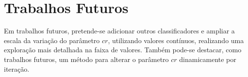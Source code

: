 \section{Trabalhos Futuros}
    \label{sec:trabalhos-futuros}
    Em trabalhos futuros, pretende\hyp{se} adicionar outros classificadores e ampliar a escala da variação do parâmetro $cr$, utilizando valores contínuos, realizando uma exploração mais detalhada na faixa de valores. Também pode\hyp{se} destacar, como trabalhos futuros, um método para alterar o parâmetro $cr$ dinamicamente por iteração.